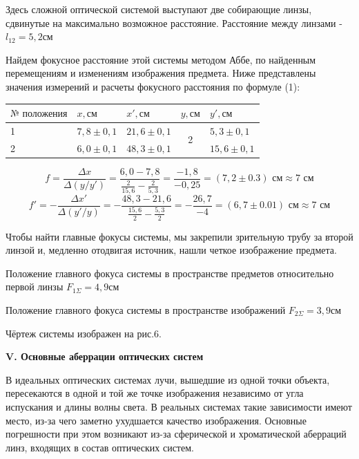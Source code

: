 \documentclass[a4paper,12pt]{report}
\begin{document}
Здесь сложной оптической системой выступают две собирающие линзы, сдвинутые на максимально возможное расстояние. Расстояние между линзами - $l_{12} = 5,2 \text{см}$

Найдем фокусное расстояние этой системы методом Аббе, по найденным перемещениям и изменениям изображения предмета. Ниже представлены значения измерений и расчеты фокусного расстояния по формуле (1):

\begin{table}[h!]
\centering
\begin{tabular}{|l|l|l|c|l|}
\hline
$\text{№ положения}$ & $x, \text{см}$   & $x', \text{см}$   & \multicolumn{1}{l|}{$y, \text{см}$} & $y', \text{см}$   \\ \hline
1         & $7,8\pm0,1$ & $21,6\pm0,1$ & \multirow{2}{*}{2}     & $5,3\pm0,1$  \\ \cline{1-3} \cline{5-5} 
2         & $6,0\pm0,1$   & $48,3\pm0,1$ &                        & $15,6\pm0,1$ \\ \hline
\end{tabular}
\end{table}

\begin{equation*}
    f = \frac{\Delta x}{\Delta(y/y')} = \frac{6,0 - 7,8}{\frac{2}{15,6} - \frac{2}{5,3}} = \frac{-1,8}{-0,25} = (7,2 \pm 0.3) \text{ см} \approx 7 \text{ см} 
\end{equation*}
\begin{equation*}
    f' = -\frac{\Delta x'}{\Delta(y'/y)} = - \frac{48,3 - 21,6}{\frac{15,6}{2} - \frac{5,3}{2}} = -\frac{26,7}{-4} = (6,7 \pm 0.01) \text{ см} \approx 7 \text{ см}
\end{equation*}

Чтобы найти главные фокусы системы, мы закрепили зрительную трубу за второй линзой и, медленно отодвигая источник, нашли четкое изображение предмета. 

Положение главного фокуса системы в пространстве предметов относительно первой линзы $F_{1\Sigma} = 4,9 \text{см}$

Положение главного фокуса системы в пространстве изображений $F_{2\Sigma} = 3,9 \text{см}$

Чёртеж системы изображен на рис.6.

\noindent\textbf{V. Основные аберрации оптических систем}

В идеальных оптических системах лучи, вышедшие из одной точки
объекта, пересекаются в одной и той же точке изображения независимо от угла испускания и длины волны света. В реальных системах такие зависимости имеют место, из-за чего заметно ухудшается качество
изображения. Основные погрешности при этом возникают из-за сферической и хроматической аберраций линз, входящих в состав оптических
систем.
\end{document}
